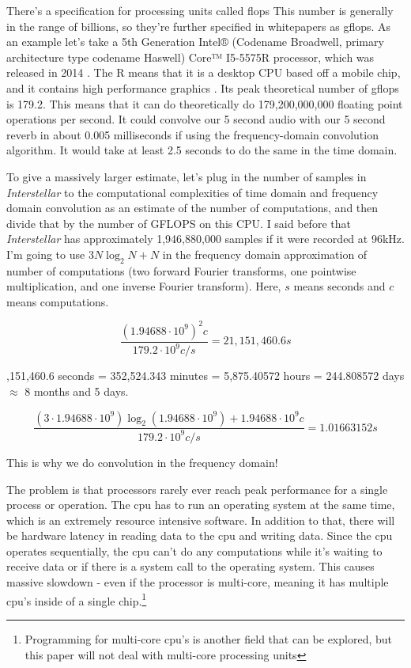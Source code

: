 There's a specification for processing units called \gls{flops} This number is generally in the range of billions, so they're further specified in whitepapers as \gls{gflops}. As an example let's take a 5th Generation Intel® (Codename Broadwell, primary architecture type codename Haswell) Core™ I5-5575R  processor, which was released in 2014 \citep{export_compliance}. The R means that it is a desktop CPU based off a mobile chip, and it contains high performance graphics \citep{intel}. Its peak theoretical number of \gls{gflops} is 179.2. This means that it can do theoretically do 179,200,000,000 floating point operations per second. It could convolve our 5 second audio with our 5 second reverb in about 0.005 milliseconds if using the frequency-domain convolution algorithm. It would take at least 2.5 seconds to do the same in the time domain. 

To give a massively larger estimate, let's plug in the number of samples in \textit{Interstellar} to the computational complexities of time domain and frequency domain convolution as an estimate of the number of computations, and then divide that by the number of GFLOPS on this CPU. I said before that \textit{Interstellar} has approximately 1,946,880,000 samples if it were recorded at 96kHz. I'm going to use $3N\log_2N + N$ in the frequency domain approximation of number of computations (two forward Fourier transforms, one pointwise multiplication, and one inverse Fourier transform). Here, $s$ means seconds and $c$ means computations.

$$ \frac{(1.94688 \cdot 10^9)^2 c}{179.2 \cdot 10^9  c/s} = 21,151,460.6s$$

,151,460.6 seconds = 352,524.343 minutes = 5,875.40572 hours = 244.808572 days $\approx$ 8 months and 5 days.

$$\frac{(3 \cdot 1.94688 \cdot 10^9)\log_2(1.94688 \cdot 10^9) + 1.94688 \cdot 10^9 c}{179.2 \cdot 10^9 c/s} = 1.01663152s$$

This is why we do convolution in the frequency domain!


The problem is that processors rarely ever reach peak performance for a single process or operation. The \gls{cpu} has to run an operating system at the same time, which is an extremely resource intensive software. In addition to that, there will be hardware latency in reading data to the \gls{cpu} and writing data. Since the \gls{cpu} operates sequentially, the \gls{cpu} can't do any computations while it's waiting to receive data or if there is a system call to the operating system. This causes massive slowdown - even if the processor is multi-core, meaning it has multiple \gls{cpu}'s inside of a single chip.\footnote{Programming for multi-core \gls{cpu}'s is another field that can be explored, but this paper will not deal with multi-core processing units} 

